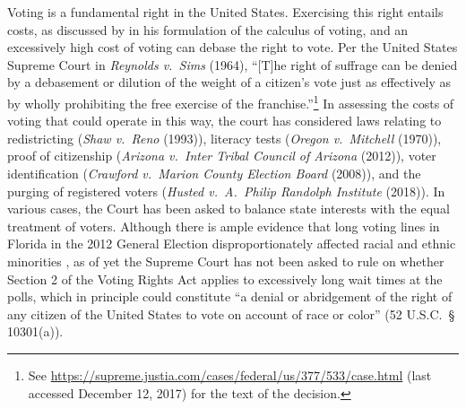 \documentclass[12pt,titlepage]{article}
\begin{document}
Voting is a fundamental right in the United States. Exercising this
right entails costs, as discussed by \cite{downs:econtheory} in his
formulation of the calculus of voting, and an excessively high cost of
voting can debase the right to vote. Per the United States Supreme
Court in \emph{Reynolds v.\ Sims} (1964), ``[T]he right of suffrage
can be denied by a debasement or dilution of the weight of a citizen's
vote just as effectively as by wholly prohibiting the free exercise of
the franchise.''\footnote{See
  \url{https://supreme.justia.com/cases/federal/us/377/533/case.html}
  (last accessed December 12, 2017) for the text of the decision.} In
assessing the costs of voting that could operate in this way, the
court has considered laws relating to redistricting (\emph{Shaw v.\
  Reno} (1993)), literacy tests (\emph{Oregon v.\
  Mitchell} (1970)), proof of citizenship (\emph{Arizona v.\ Inter
  Tribal Council of Arizona} (2012)), voter identification
(\emph{Crawford v.\ Marion County
  Election Board} (2008)), and the purging of registered voters
(\emph{Husted v.\ A.\ Philip Randolph Institute} (2018)). In various
cases, the Court has been asked to balance state interests with the
equal treatment of voters.  Although there is ample evidence that long
voting lines in Florida in the 2012 General Election
disproportionately affected racial and ethnic minorities
\citep{herron_smith2014}, as of yet the Supreme Court has not been
asked to rule on whether Section 2 of the Voting Rights Act applies to
excessively long wait times at the polls, which in principle could
constitute ``a denial or abridgement of the right of any citizen of
the United States to vote on account of race or color'' (52 U.S.C.\ \S
10301(a)).
\end{document}
